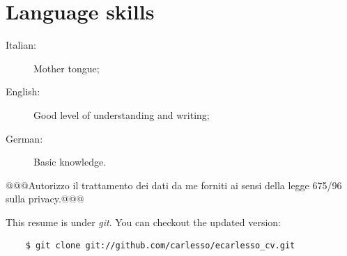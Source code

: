 \documentclass[pdftex, a4paper, 11pt]{article}
\begin{document}
\section*{Language skills}
\begin{description}
\item[Italian:] Mother tongue;
\item[English:] Good level of understanding and writing;
\item[German:] Basic knowledge.
\end{description}


\vfill

@@@Autorizzo il trattamento dei dati da me forniti ai sensi della legge
675/96 sulla privacy.@@@

\vspace{1cm}

\footnotesize {This resume is under {\em git}. You can checkout the updated version:}
\begin{verbatim}
    $ git clone git://github.com/carlesso/ecarlesso_cv.git
\end{verbatim}
\end{document}
